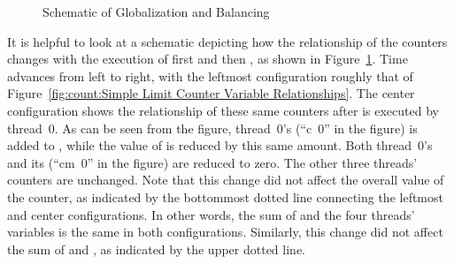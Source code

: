 \QuickQuizEnd

\begin{figure}
\centering
{}
\caption{Schematic of Globalization and Balancing}
\label{fig:count:Schematic of Globalization and Balancing}
\end{figure}

It is helpful to look at a schematic depicting how the relationship
of the counters changes with the execution of first
 and then , as shown in
Figure~\ref{fig:count:Schematic of Globalization and Balancing}.
Time advances from left to right, with the leftmost configuration
roughly that of
Figure~\ref{fig:count:Simple Limit Counter Variable Relationships}.
The center configuration shows the relationship of these same counters
after  is executed by thread~0.
As can be seen from the figure, thread~0's  (``c~0'' in
the figure) is added to , while the value of
 is reduced by this same amount.
Both thread~0's  and its 
(``cm~0'' in the figure) are reduced to zero.
The other three threads' counters are unchanged.
Note that this change did not affect the overall value of the counter,
as indicated by the bottommost dotted line connecting the leftmost
and center configurations.
In other words, the sum of  and the four threads'
 variables is the same in both configurations.
Similarly, this change did not affect the sum of  and
, as indicated by the upper dotted line.

